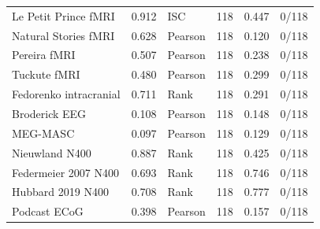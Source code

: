 {\begin{longtable}{@{}lrlrrr@{}}
Le Petit Prince fMRI & 0.912 & ISC & 118 & 0.447 & 0/118 \\
Natural Stories fMRI & 0.628 & Pearson & 118 & 0.120 & 0/118 \\
Pereira fMRI & 0.507 & Pearson & 118 & 0.238 & 0/118 \\
Tuckute fMRI & 0.480 & Pearson & 118 & 0.299 & 0/118 \\
Fedorenko intracranial & 0.711 & Rank & 118 & 0.291 & 0/118 \\
Broderick EEG & 0.108 & Pearson & 118 & 0.148 & 0/118 \\
MEG-MASC & 0.097 & Pearson & 118 & 0.129 & 0/118 \\
Nieuwland N400 & 0.887 & Rank & 118 & 0.425 & 0/118 \\
Federmeier 2007 N400 & 0.693 & Rank & 118 & 0.746 & 0/118 \\
Hubbard 2019 N400 & 0.708 & Rank & 118 & 0.777 & 0/118 \\
Podcast ECoG & 0.398 & Pearson & 118 & 0.157 & 0/118 \\
\end{longtable}
}
